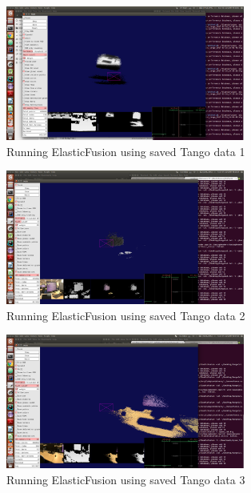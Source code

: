 \documentclass[12pt,twoside]{article}
\begin{document}

\begin{figure}[h]
    \centering
    \includegraphics[width=0.7\textwidth]{figures/Screenshot2}
    \caption{Running ElasticFusion using saved Tango data 1}
    \label{fig:Screenshot2}
\end{figure}

\begin{figure}[h]
    \centering
    \includegraphics[width=0.7\textwidth]{figures/Screenshot3}
    \caption{Running ElasticFusion using saved Tango data 2}
    \label{fig:Screenshot3}
\end{figure}

\begin{figure}[h]
    \centering
    \includegraphics[width=0.7\textwidth]{figures/Screenshot9}
    \caption{Running ElasticFusion using saved Tango data 3}
    \label{fig:Screenshot9}
\end{figure}
\end{document}
